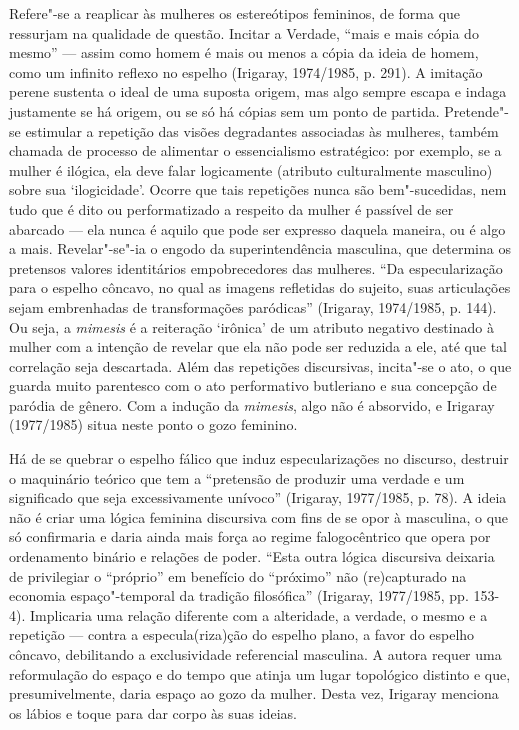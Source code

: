 Refere"-se a reaplicar às mulheres os estereótipos femininos, de forma
que ressurjam na qualidade de questão. Incitar a Verdade, ``mais e mais
cópia do mesmo'' --- assim como homem é mais ou menos a cópia da ideia
de homem, como um infinito reflexo no espelho (Irigaray, 1974/1985, p.
291). A imitação perene sustenta o ideal de uma suposta origem, mas algo
sempre escapa e indaga justamente se há origem, ou se só há cópias sem
um ponto de partida. Pretende"-se estimular a repetição das visões
degradantes associadas às mulheres, também chamada de processo de
alimentar o essencialismo estratégico: por exemplo, se a mulher é
ilógica, ela deve falar logicamente (atributo culturalmente masculino)
sobre sua `ilogicidade'. Ocorre que tais repetições nunca são
bem"-sucedidas, nem tudo que é dito ou performatizado a respeito da
mulher é passível de ser abarcado --- ela nunca é aquilo que pode ser
expresso daquela maneira, ou é algo a mais. Revelar"-se"-ia o engodo da
superintendência masculina, que determina os pretensos valores
identitários empobrecedores das mulheres. ``Da especularização para o
espelho côncavo, no qual as imagens refletidas do sujeito, suas
articulações sejam embrenhadas de transformações paródicas'' (Irigaray,
1974/1985, p. 144). Ou seja, a \emph{mimesis} é a reiteração `irônica'
de um atributo negativo destinado à mulher com a intenção de revelar que
ela não pode ser reduzida a ele, até que tal correlação seja descartada.
Além das repetições discursivas, incita"-se o ato, o que guarda muito
parentesco com o ato performativo butleriano e sua concepção de paródia
de gênero. Com a indução da \emph{mimesis}, algo não é absorvido, e
Irigaray (1977/1985) situa neste ponto o gozo feminino.

Há de se quebrar o espelho fálico que induz especularizações no
discurso, destruir o maquinário teórico que tem a ``pretensão de
produzir uma verdade e um significado que seja excessivamente unívoco''
(Irigaray, 1977/1985, p. 78). A ideia não é criar uma lógica feminina
discursiva com fins de se opor à masculina, o que só confirmaria e daria
ainda mais força ao regime falogocêntrico que opera por ordenamento
binário e relações de poder. ``Esta outra lógica discursiva deixaria de
privilegiar o ``próprio'' em benefício do ``próximo'' não (re)capturado
na economia espaço"-temporal da tradição filosófica'' (Irigaray,
1977/1985, pp. 153-4). Implicaria uma relação diferente com a
alteridade, a verdade, o mesmo e a repetição --- contra a
especula(riza)ção do espelho plano, a favor do espelho côncavo,
debilitando a exclusividade referencial masculina. A autora requer uma
reformulação do espaço e do tempo que atinja um lugar topológico
distinto e que, presumivelmente, daria espaço ao gozo da mulher. Desta
vez, Irigaray menciona os lábios e toque para dar corpo às suas ideias.


